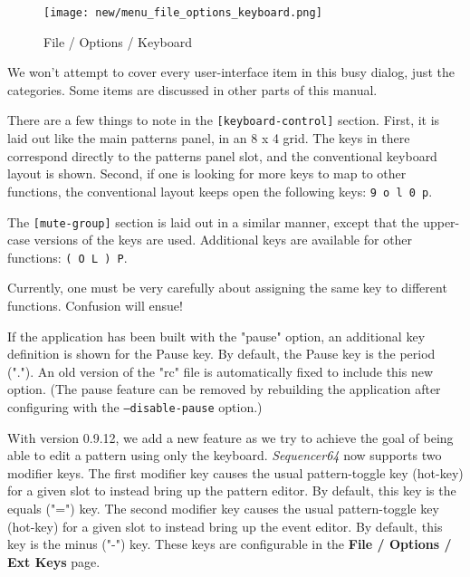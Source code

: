 \begin{figure}[H]
   \centering 
%
%
   \texttt{[image: new/menu\_file\_options\_keyboard.png]}
   \caption{File / Options / Keyboard}
   \label{fig:seq64_menu_file_options_keyboard}
\end{figure}

   We won't attempt to cover every user-interface item in this busy
   dialog, just the categories.  Some items are discussed in other parts of
   this manual.

   There are a few things to note in the \texttt{[keyboard-control]} section.
   First, it is laid out like the main patterns panel, in an 8 x 4 grid.
   The keys in there correspond directly to the patterns panel slot, and the
   conventional keyboard layout is shown.
   Second, if one is looking for more keys to map to other functions, the
   conventional layout keeps open the following keys:
   \texttt{9 o l 0 p}.

   The \texttt{[mute-group]} section is laid out in a similar manner, except
   that the upper-case versions of the keys are used.  Additional keys
   are available for other functions:
   \texttt{( O L ) P}.

   Currently, one must be very carefully about assigning the same key to
   different functions.  Confusion will ensue!

   If the application has been built with the "pause" option, an
   additional key definition is shown for the Pause key.
   By default, the Pause key is the period (".").  An old version of
   the "rc" file is automatically fixed to include this new option.
   (The pause feature can be removed by rebuilding the application
   after configuring with the \texttt{--disable-pause} option.)


   With version 0.9.12, we add a new feature as we try to achieve the goal of
   being able to edit a pattern using only the keyboard.
   \textsl{Sequencer64} now supports two modifier keys.
   The first modifier key causes the usual pattern-toggle key (hot-key) for a
   given slot to instead bring up the pattern editor.  By default, this key is
   the equals ("=") key.  The second modifier key causes the usual
   pattern-toggle key (hot-key) for a given slot to instead bring up the event
   editor.  By default, this key is the minus ("-") key.
   These keys are configurable in the
   \textbf{File / Options / Ext Keys} page.


